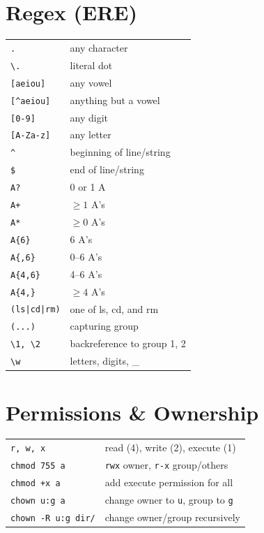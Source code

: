 \documentclass[a4paper, twocolumn]{article}
\renewcommand{\tt}{\texttt}
\begin{document}
\section{Regex (ERE)}
\begin{tabular}{ll}
    \verb|.|            & any character                             \\
    \verb|\.|           & literal dot                               \\
    \verb|[aeiou]|      & any vowel                                 \\
    \verb|[^aeiou]|     & anything but a vowel                      \\
    \verb|[0-9]|        & any digit                                 \\
    \verb|[A-Za-z]|     & any letter                                \\
    \verb|^|            & beginning of line/string                  \\
    \verb|$|            & end of line/string                        \\
    \verb|A?|           & 0 or 1 A                                  \\
    \verb|A+|           & $\ge 1$ A's                               \\
    \verb|A*|           & $\ge 0$ A's                               \\
    \verb|A{6}|         & 6 A's                                     \\
    \verb|A{,6}|        & 0--6 A's                                  \\
    \verb|A{4,6}|       & 4--6 A's                                  \\
    \verb|A{4,}|        & $\ge 4$ A's                               \\
    \verb!(ls|cd|rm)!   & one of ls, cd, and rm                     \\
    \verb|(...)|        & capturing group                           \\
    \verb|\1, \2|       & backreference to group 1, 2               \\
    \verb|\w|           & letters, digits, \_                       
\end{tabular}

\section{Permissions \& Ownership}
\begin{tabular}{ll}
    \tt{r, w, x}            & read (4), write (2), execute (1)      \\
    \tt{chmod 755 a}        & \tt{rwx} owner, \tt{r-x} group/others \\
    \tt{chmod +x a}         & add execute permission for all        \\
    \tt{chown u:g a}        & change owner to \tt{u}, group to \tt{g}\\
    \tt{chown -R u:g dir/}  & change owner/group recursively        
\end{tabular}
\end{document}
